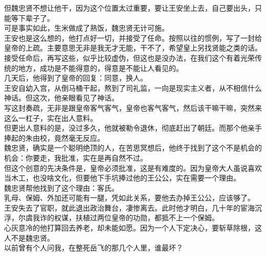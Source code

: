 \begin{multicols}{\theparacolNo}
但魏忠贤不想让他干，因为这个位置太过重要，要让王安坐上去，自己要出头，只能等下辈子了。\\

可是事实如此，生米做成了熟饭，魏忠贤无计可施。\\

王安也是这么想的，他打点好一切，并接受了任命。按照以往的惯例，写了一封给皇帝的上疏。主要意思无非是我无才无能，干不了，希望皇上另找贤能之类的话。\\

接受任命后，再写这些，似乎比较虚伪，但这也是没办法，在我们这个有着光荣传统的地方，成功是不能得意的，得意是不能让人看见的。\\

几天后，他得到了皇帝的回复：同意，换人。\\

王安自幼入宫，从倒马桶干起，熬到了司礼监，一向是现实主义者，从不相信什么神话。但这次，他亲眼看见了神话。\\

写这封奏疏，无非是跟皇帝客气客气，皇帝也客气客气，然后该干嘛干嘛，突然来这么一杠子，实在出人意料。\\

但更出人意料的是，没过多久，他就被勒令退休，彻底赶出了朝廷。而那个他亲手捧起的朱由校，竟然毫无反应。\\

魏忠贤，确实是一个聪明绝顶的人，在苦思冥想后，他终于找到了这个不是机会的机会：你要走，我批准，实在是再自然不过。\\

但这个创意的先决条件是，皇帝必须批准，这是有难度的。因为皇帝大人虽说喜欢当木工，也没啥文化，但要他下手坑捧过他的王公公，实在需要一个理由。\\

魏忠贤帮他找到了这个理由：客氏。\\

乳母、保姆、外加还可能有一腿，凭如此关系，要他去办掉王公公，应该够了。\\

王安失去了官职，就此退出政治舞台，凄惨离去。此时他才明白，几十年的宦海沉浮，尔虞我诈的权谋，扶植过两位皇帝的功勋，都抵不上一个保姆。\\

心灰意冷的他打算回去养老，却未能如愿。因为一个人下定决心，要斩草除根，这人不是魏忠贤。\\

以前曾有个人问我，在整死岳飞的那几个人里，谁最坏？\\


\end{multicols}

